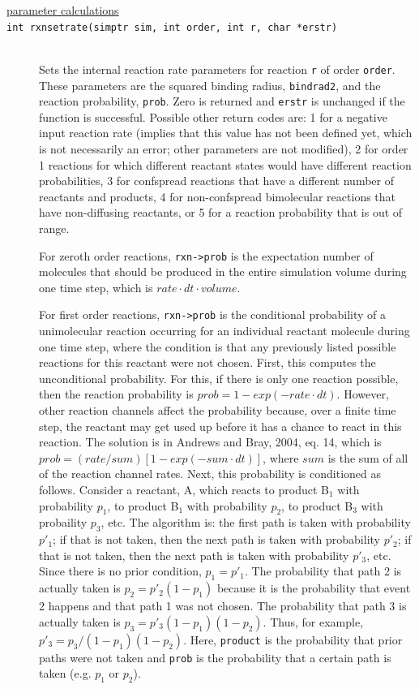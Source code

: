 \documentclass {scrbook}
\newcommand {\ttt} {\texttt}
\begin{document}
\begin{description}
\item[\underline{parameter calculations}]

\item[\ttt{int rxnsetrate(simptr sim, int order, int r, char *erstr)}]
\hfill \\
Sets the internal reaction rate parameters for reaction \ttt{r} of order \ttt{order}. These parameters are the squared binding radius, \ttt{bindrad2}, and the reaction probability, \ttt{prob}. Zero is returned and \ttt{erstr} is unchanged if the function is successful. Possible other return codes are: 1 for a negative input reaction rate (implies that this value has not been defined yet, which is not necessarily an error; other parameters are not modified), 2 for order 1 reactions for which different reactant states would have different reaction probabilities, 3 for confspread reactions that have a different number of reactants and products, 4 for non-confspread bimolecular reactions that have non-diffusing reactants, or 5 for a reaction probability that is out of range.

For zeroth order reactions, \ttt{rxn->prob} is the expectation number of molecules that should be produced in the entire simulation volume during one time step, which is $rate \cdot dt \cdot volume$.

For first order reactions, \ttt{rxn->prob} is the conditional probability of a unimolecular reaction occurring for an individual reactant molecule during one time step, where the condition is that any previously listed possible reactions for this reactant were not chosen. First, this computes the unconditional probability. For this, if there is only one reaction possible, then the reaction probability is $prob=1-exp(-rate \cdot dt)$. However, other reaction channels affect the probability because, over a finite time step, the reactant may get used up before it has a chance to react in this reaction. The solution is in Andrews and Bray, 2004, eq. 14, which is $prob=(rate/sum)[1-exp(-sum \cdot dt)]$, where $sum$ is the sum of all of the reaction channel rates. Next, this probability is conditioned as follows. Consider a reactant, A, which reacts to product B$_1$ with probability $p_{1}$, to product B$_1$ with probability $p_2$, to product B$_3$ with probaility $p_3$, etc. The algorithm is: the first path is taken with probability $p'_1$; if that is not taken, then the next path is taken with probability $p'_2$; if that is not taken, then the next path is taken with probability $p'_3$, etc. Since there is no prior condition, $p_1=p'_1$. The probability that path 2 is actually taken is $p_2=p'_{2}(1-p_1)$ because it is the probability that event 2 happens and that path 1 was not chosen. The probability that path 3 is actually taken is $p_3=p'_{3}(1-p_1)(1-p_2)$. Thus, for example, $p'_3=p_3/(1-p_1)(1-p_2)$. Here, \ttt{product} is the probability that prior paths were not taken and \ttt{prob} is the probability that a certain path is taken (e.g. $p_1$ or $p_2$).


\end{description}
\end{document}
